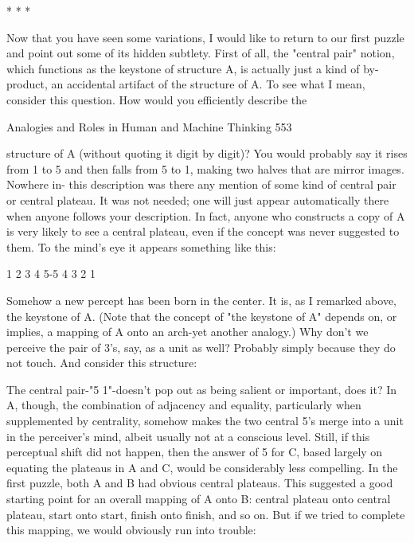                                         *   *   *

       Now that you have seen some variations, I would like to return to our first
puzzle and point out some of its hidden subtlety. First of all, the "central pair" notion,
which functions as the keystone of structure A, is actually just a kind of by-product,
an accidental artifact of the structure of A. To see what I mean, consider this question.
How would you efficiently describe the




Analogies and Roles in Human and Machine Thinking                                     553

structure of A (without quoting it digit by digit)? You would probably say it rises
from 1 to 5 and then falls from 5 to 1, making two halves that are mirror images.
Nowhere in- this description was there any mention of some kind of central pair or
central plateau. It was not needed; one will just appear automatically there when
anyone follows your description. In fact, anyone who constructs a copy of A is very
likely to see a central plateau, even if the concept was never suggested to them. To the
mind's eye it appears something like this:

               1 2 3 4 5-5 4 3 2 1

       Somehow a new percept has been born in the center. It is, as I remarked above,
the keystone of A. (Note that the concept of "the keystone of A" depends on, or
implies, a mapping of A onto an arch-yet another analogy.)
       Why don't we perceive the pair of 3's, say, as a unit as well? Probably simply
because they do not touch. And consider this structure:


        The central pair-"5 1"-doesn't pop out as being salient or important, does it? In
A, though, the combination of adjacency and equality, particularly when
supplemented by centrality, somehow makes the two central 5's merge into a unit in
the perceiver's mind, albeit usually not at a conscious level. Still, if this perceptual
shift did not happen, then the answer of 5 for C, based largely on equating the
plateaus in A and C, would be considerably less compelling.
        In the first puzzle, both A and B had obvious central plateaus. This suggested
a good starting point for an overall mapping of A onto B: central plateau onto central
plateau, start onto start, finish onto finish, and so on. But if we tried to complete this
mapping, we would obviously run into trouble:



